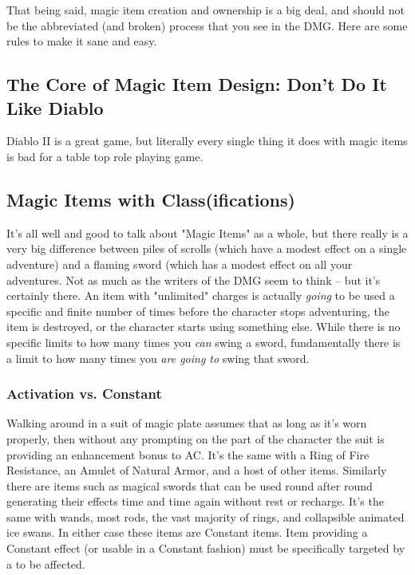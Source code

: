 That being said, magic item creation and ownership is a big deal, and should not be the abbreviated (and broken) process that you see in the DMG. Here are some rules to make it sane and easy.

\subsection{The Core of Magic Item Design: Don't Do It Like Diablo}

Diablo II is a great game, but literally every single thing it does with magic items is bad for a table top role playing game.

\subsection{Magic Items with Class(ifications)}

It's all well and good to talk about "Magic Items" as a whole, but there really is a very big difference between piles of scrolls (which have a modest effect on a single adventure) and a flaming sword (which has a modest effect on all your adventures. Not as much as the writers of the DMG seem to think -- but it's certainly there. An item with "unlimited" charges is actually \textit{going} to be used a specific and finite number of times before the character stops adventuring, the item is destroyed, or the character starts using something else. While there is no specific limits to how many times you \textit{can} swing a sword, fundamentally there is a limit to how many times you \textit{are going to} swing that sword.

\subsubsection{Activation vs. Constant}

Walking around in a suit of magic plate assumes that as long as it's worn properly, then without any prompting on the part of the character the suit is providing an enhancement bonus to AC. It's the same with a Ring of Fire Resistance, an Amulet of Natural Armor, and a host of other items. Similarly there are items such as magical swords that can be used round after round generating their effects time and time again without rest or recharge. It's the same with wands, most rods, the vast majority of rings, and collapsible animated ice swans. In either case these items are Constant items. Item providing a Constant effect (or usable in a Constant fashion) must be specifically targeted by a  to be affected.

